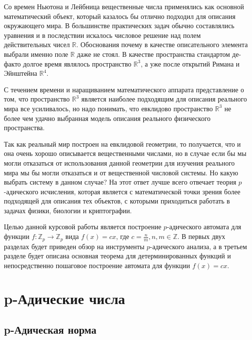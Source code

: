 \documentclass[och, master]{SCWorks}
\theoremstyle{plain}
\theoremstyle{plain}
\theoremstyle{plain}
\theoremstyle{definition}
\begin{document}
\intro
Со времен Ньютона и Лейбница вещественные числа применялись как основной математический объект, который казалось бы отлично подходил для описания окружающего мира. В большинстве практических задач обычно составлялись уравнения и в последствии искалось числовое решение над полем действительных чисел $\mathbb {R}$. Обоснования почему в качестве описательного элемента выбрали именно поле $\mathbb {R}$ даже не стоял. В качестве пространства стандартом де-факто долгое время являлось пространство $\mathbb {R}^3$, а уже после открытий Римана и Эйнштейна $\mathbb {R}^4$. 

С течением времени и наращиванием математического аппарата представление о том, что пространство $\mathbb {R}^3$ является наиболее подходящим для описания реального мира все усиливалось, но надо понимать, что евклидово пространство $\mathbb {R}^3$ не более чем удачно выбранная модель описания реального физического пространства. 

Так как реальный мир построен на евклидовой геометрии, то получается, что и она очень хорошо описывается вещественными числами, но в случае если бы мы могли отказаться от использования данной геометрии для изучения реального мира мы бы могли отказаться и от вещественной числовой системы. Но какую выбрать систему в данном случае? На этот ответ лучше всего отвечает теория $p$-адического исчисления, которая является с математической точки зрения более подходящей для описания тех объектов, с которыми приходиться работать в задачах физики, биологии и криптографии.\cite{bib:kozirev:2008}

Целью данной курсовой работы является построение $p$-адического автомата для функции $f: \mathbb Z_p \rightarrow \mathbb Z_p$ вида $f(x)=cx$, где $c=\frac{n}{m}, n,m \in \mathbb Z$. В первых двух разделах будет приведен обзор на инструменты $p$-адического анализа, а в третьем разделе будет описана основная теорема\cite{bib:crypto:anashin} для детерминированных функций и непосредственно пошаговое построение автомата для функции $f(x)=cx$.

\section{p-Адические числа}

\subsection{p-Адическая норма}
\end{document}
